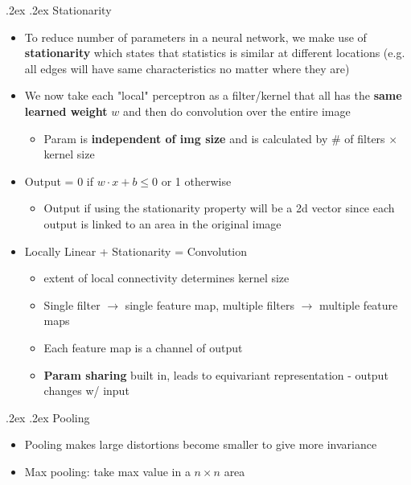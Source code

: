 \documentclass[landscape,a4paper]{article}
\makeatletter
\renewcommand{\subsection}{\@startsection{subsection}{1}{0mm}%
	{.2ex}%
	{.2ex}%
	{\sffamily\bfseries}}
\makeatother
\begin{document}
\begin{multicols*}{4}
	\subsection{Stationarity}
	\begin{itemize}
		\item To reduce number of parameters in a neural network, we make use of \textbf{stationarity} which states that statistics is similar at different locations (e.g. all edges will have same characteristics no matter where they are)
		\item We now take each "local" perceptron as a filter/kernel that all has the \textbf{same learned weight} $w$ and then do convolution over the entire image
		\begin{itemize}
			\item Param is \textbf{independent of img size} and is calculated by \# of filters $\times$ kernel size
		\end{itemize}
		\item Output = 0 if $w\cdot x + b \leq 0$ or 1 otherwise
		\begin{itemize}
			\item Output if using the stationarity property will be a 2d vector since each output is linked to an area in the original image
		\end{itemize}
		\item Locally Linear + Stationarity = Convolution
		\begin{itemize}
			\item extent of local connectivity determines kernel size
			\item Single filter $\rightarrow$ single feature map, multiple filters $\rightarrow$ multiple feature maps
			\item Each feature map is a channel of output
			\item \textbf{Param sharing} built in, leads to equivariant representation - output changes w/ input
		\end{itemize}
	\end{itemize}
	\subsection{Pooling}
	\begin{itemize}
		\item Pooling makes large distortions become smaller to give more invariance
		\item Max pooling: take max value in a $n\times n$ area 
	\end{itemize}

\end{multicols*}
\end{document}
